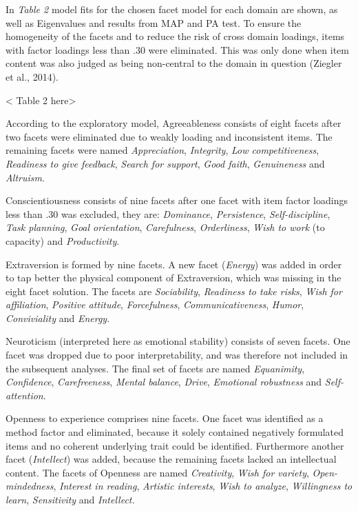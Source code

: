 \documentclass[,man,floatsintext]{apa6}
\begin{document}
In \emph{Table 2} model fits for the chosen facet model for each domain
are shown, as well as Eigenvalues and results from MAP and PA test. To
ensure the homogeneity of the facets and to reduce the risk of cross
domain loadings, items with factor loadings less than .30 were
eliminated. This was only done when item content was also judged as
being non-central to the domain in question (Ziegler et al., 2014).

\vspace{5mm}

\textless{} Table 2 here\textgreater{}

\vspace{5mm}

According to the exploratory model, Agreeableness consists of eight
facets after two facets were eliminated due to weakly loading and
inconsistent items. The remaining facets were named \emph{Appreciation},
\emph{Integrity}, \emph{Low competitiveness}, \emph{Readiness to give
feedback}, \emph{Search for support}, \emph{Good faith},
\emph{Genuineness} and \emph{Altruism}.

Conscientiousness consists of nine facets after one facet with item
factor loadings less than .30 was excluded, they are: \emph{Dominance},
\emph{Persistence}, \emph{Self-discipline}, \emph{Task planning},
\emph{Goal orientation}, \emph{Carefulness}, \emph{Orderliness},
\emph{Wish to work} (to capacity) and \emph{Productivity}.

Extraversion is formed by nine facets. A new facet (\emph{Energy}) was
added in order to tap better the physical component of Extraversion,
which was missing in the eight facet solution. The facets are
\emph{Sociability}, \emph{Readiness to take risks}, \emph{Wish for
affiliation}, \emph{Positive attitude}, \emph{Forcefulness},
\emph{Communicativeness}, \emph{Humor}, \emph{Conviviality} and
\emph{Energy}.

Neuroticism (interpreted here as emotional stability) consists of seven
facets. One facet was dropped due to poor interpretability, and was
therefore not included in the subsequent analyses. The final set of
facets are named \emph{Equanimity}, \emph{Confidence},
\emph{Carefreeness}, \emph{Mental balance}, \emph{Drive},
\emph{Emotional robustness} and \emph{Self-attention}.

Openness to experience comprises nine facets. One facet was identified
as a method factor and eliminated, because it solely contained
negatively formulated items and no coherent underlying trait could be
identified. Furthermore another facet (\emph{Intellect}) was added,
because the remaining facets lacked an intellectual content. The facets
of Openness are named \emph{Creativity}, \emph{Wish for variety},
\emph{Open-mindedness}, \emph{Interest in reading}, \emph{Artistic
interests}, \emph{Wish to analyze}, \emph{Willingness to learn},
\emph{Sensitivity} and \emph{Intellect.}
\end{document}
